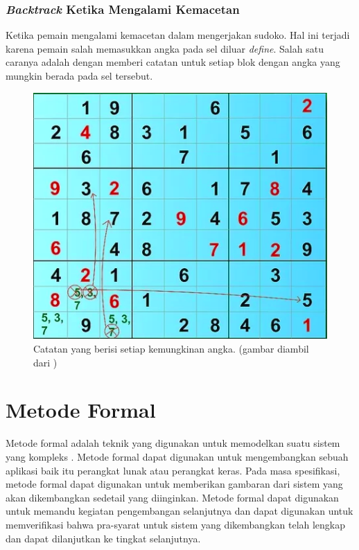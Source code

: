 \subsubsection{\textit{Backtrack} Ketika Mengalami Kemacetan}

Ketika pemain mengalami kemacetan dalam mengerjakan sudoko. Hal ini terjadi karena pemain salah  memasukkan angka pada sel diluar \textit{define}. Salah satu caranya adalah dengan memberi catatan untuk setiap blok dengan angka yang mungkin berada  pada sel tersebut.



\begin{figure}[H]
	\begin{centering}
		\includegraphics[scale=0.7]{gambar/solve4}
		
		\caption{Catatan yang berisi setiap kemungkinan angka. (gambar diambil dari \cite{Sud12})}
		\end{centering}
		\end{figure}
		


\section{Metode Formal}

Metode formal adalah teknik yang digunakan untuk memodelkan suatu
sistem yang kompleks \cite{huth2004logic}. Metode formal dapat digunakan untuk mengembangkan
sebuah aplikasi baik itu perangkat lunak atau perangkat keras. Pada
masa spesifikasi, metode formal dapat digunakan untuk memberikan gambaran
dari sistem yang akan dikembangkan sedetail yang diinginkan. Metode
formal dapat digunakan untuk memandu kegiatan pengembangan selanjutnya
dan dapat digunakan untuk memverifikasi bahwa pra-syarat untuk sistem yang
dikembangkan telah lengkap dan dapat dilanjutkan ke tingkat selanjutnya.

